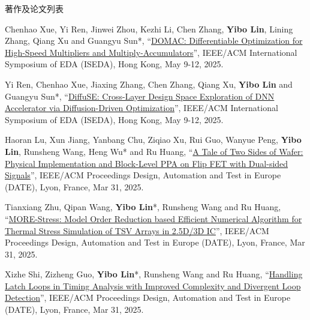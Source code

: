 \begin{rSection}{著作及论文列表}
\begin{description}[font=\normalfont, rightmargin=2em]
\item[{[C177]}]{
        Chenhao Xue, Yi Ren, Jinwei Zhou, Kezhi Li, Chen Zhang, \textbf{Yibo Lin}, Lining Zhang, Qiang Xu and Guangyu Sun*, 
    ``\href{https://doi.org/10.1109/ISEDA65950.2025.11101018}{DOMAC: Differentiable Optimization for High-Speed Multipliers and Multiply-Accumulators}'', 
    IEEE/ACM International Symposium of EDA (ISEDA), Hong Kong, May 9-12, 2025.
    
}
            

\item[{[C176]}]{
        Yi Ren, Chenhao Xue, Jiaxing Zhang, Chen Zhang, Qiang Xu, \textbf{Yibo Lin} and Guangyu Sun*, 
    ``\href{https://doi.org/10.1109/ISEDA65950.2025.11100315}{DiffuSE: Cross-Layer Design Space Exploration of DNN Accelerator via Diffusion-Driven Optimization}'', 
    IEEE/ACM International Symposium of EDA (ISEDA), Hong Kong, May 9-12, 2025.
    
}
            

\item[{[C175]}]{
        Haoran Lu, Xun Jiang, Yanbang Chu, Ziqiao Xu, Rui Guo, Wanyue Peng, \textbf{Yibo Lin}, Runsheng Wang, Heng Wu* and Ru Huang, 
    ``\href{https://doi.org/10.23919/DATE64628.2025.10993282}{A Tale of Two Sides of Wafer: Physical Implementation and Block-Level PPA on Flip FET with Dual-sided Signals}'', 
    IEEE/ACM Proceedings Design, Automation and Test in Europe (DATE), Lyon, France, Mar 31, 2025.
    
}
            

\item[{[C174]}]{
        Tianxiang Zhu, Qipan Wang, \textbf{Yibo Lin}*, Runsheng Wang and Ru Huang, 
    ``\href{https://doi.org/10.23919/DATE64628.2025.10993234}{MORE-Stress: Model Order Reduction based Efficient Numerical Algorithm for Thermal Stress Simulation of TSV Arrays in 2.5D/3D IC}'', 
    IEEE/ACM Proceedings Design, Automation and Test in Europe (DATE), Lyon, France, Mar 31, 2025.
    
}
            

\item[{[C173]}]{
        Xizhe Shi, Zizheng Guo, \textbf{Yibo Lin}*, Runsheng Wang and Ru Huang, 
    ``\href{https://doi.org/10.23919/DATE64628.2025.10993104}{Handling Latch Loops in Timing Analysis with Improved Complexity and Divergent Loop Detection}'', 
    IEEE/ACM Proceedings Design, Automation and Test in Europe (DATE), Lyon, France, Mar 31, 2025.
    
}
            


\end{description}
\end{rSection}
